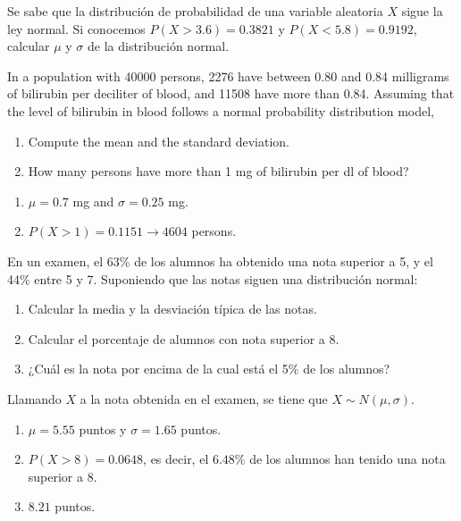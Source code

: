 {Se sabe que la distribución de probabilidad de una variable aleatoria $X$ sigue la ley normal. Si conocemos $P(X>3.6)=0.3821$ y $P(X<5.8)=0.9192$, calcular $\mu $ y $\sigma $ de la distribución normal.
}
{}
{}


{In a population with 40000 persons, 2276 have between 0.80 and 0.84 milligrams of bilirubin per deciliter of blood, and 11508 have more than 0.84.
Assuming that the level of bilirubin in blood follows a normal probability distribution model,
\begin{enumerate}
\item Compute the mean and the standard deviation.
\item How many persons have more than 1 mg of bilirubin per dl of blood?
\end{enumerate}
}
{
\begin{enumerate}
\item $\mu=0.7$ mg and $\sigma=0.25$ mg.
\item $P(X>1)=0.1151 \rightarrow 4604$ persons.
\end{enumerate}
}
{}


{En un examen, el 63\% de los alumnos ha obtenido una nota superior a 5, y el 44\% entre 5 y 7.
Suponiendo que las notas siguen una distribución normal:

\begin{enumerate}
\item  Calcular la media y la desviación típica de las notas.
\item  Calcular el porcentaje de alumnos con nota superior a 8.
\item  ¿Cuál es la nota por encima de la cual está el 5\% de los alumnos?
\end{enumerate}
}
{Llamando $X$ a la nota obtenida en el examen, se tiene que $X\sim N(\mu,\sigma)$.
\begin{enumerate}
\item $\mu=5.55$ puntos y $\sigma=1.65$ puntos.
\item $P(X>8)=0.0648$, es decir, el $6.48\%$ de los alumnos han tenido una nota superior a 8.
\item $8.21$ puntos.
\end{enumerate}
}
{}


